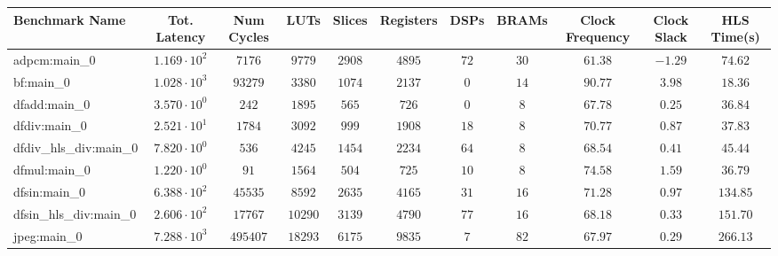 \begin{tabular}{|l|c|c|c|c|c|c|c|c|c|c|}
\hline
Benchmark Name          & Tot. Latency           & Num Cycles & LUTs      & Slices    & Registers & DSPs    & BRAMs   & Clock Frequency & Clock Slack & HLS Time(s) \\
\hline
adpcm:main\_0           & $ 1.169 \cdot 10^{2} $ & $ 7176   $ & $ 9779  $ & $ 2908  $ & $ 4895  $ & $ 72  $ & $ 30  $ & $ 61.38       $ & $ -1.29   $ & $ 74.62   $ \\
bf:main\_0              & $ 1.028 \cdot 10^{3} $ & $ 93279  $ & $ 3380  $ & $ 1074  $ & $ 2137  $ & $ 0   $ & $ 14  $ & $ 90.77       $ & $ 3.98    $ & $ 18.36   $ \\
dfadd:main\_0           & $ 3.570 \cdot 10^{0} $ & $ 242    $ & $ 1895  $ & $ 565   $ & $ 726   $ & $ 0   $ & $ 8   $ & $ 67.78       $ & $ 0.25    $ & $ 36.84   $ \\
dfdiv:main\_0           & $ 2.521 \cdot 10^{1} $ & $ 1784   $ & $ 3092  $ & $ 999   $ & $ 1908  $ & $ 18  $ & $ 8   $ & $ 70.77       $ & $ 0.87    $ & $ 37.83   $ \\
dfdiv\_hls\_div:main\_0 & $ 7.820 \cdot 10^{0} $ & $ 536    $ & $ 4245  $ & $ 1454  $ & $ 2234  $ & $ 64  $ & $ 8   $ & $ 68.54       $ & $ 0.41    $ & $ 45.44   $ \\
dfmul:main\_0           & $ 1.220 \cdot 10^{0} $ & $ 91     $ & $ 1564  $ & $ 504   $ & $ 725   $ & $ 10  $ & $ 8   $ & $ 74.58       $ & $ 1.59    $ & $ 36.79   $ \\
dfsin:main\_0           & $ 6.388 \cdot 10^{2} $ & $ 45535  $ & $ 8592  $ & $ 2635  $ & $ 4165  $ & $ 31  $ & $ 16  $ & $ 71.28       $ & $ 0.97    $ & $ 134.85  $ \\
dfsin\_hls\_div:main\_0 & $ 2.606 \cdot 10^{2} $ & $ 17767  $ & $ 10290 $ & $ 3139  $ & $ 4790  $ & $ 77  $ & $ 16  $ & $ 68.18       $ & $ 0.33    $ & $ 151.70  $ \\
jpeg:main\_0            & $ 7.288 \cdot 10^{3} $ & $ 495407 $ & $ 18293 $ & $ 6175  $ & $ 9835  $ & $ 7   $ & $ 82  $ & $ 67.97       $ & $ 0.29    $ & $ 266.13  $ \\

\end{tabular}
